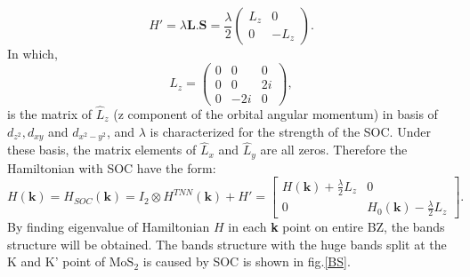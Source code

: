 \documentclass[12pt,english,a4paper]{article}
\begin{document}
	\begin{equation}
		H' = \lambda \textbf{L}.\textbf{S}=\frac{\lambda}{2}\begin{pmatrix}
			L_z &0\\
			0 & -L_z
		\end{pmatrix}.
	\end{equation}
\quad In which,
	\begin{equation}
		L_z = \begin{pmatrix}
			0 & 0 & 0\\
			0 & 0 & 2i\\
			0 & -2i& 0
		\end{pmatrix},
	\end{equation}
is the matrix of $\hat{L}_z$ (z component of the orbital angular momentum) in basis of $d_{z^2}, d_{xy}$ and $d_{x^2-y^2}$, and $\lambda$ is characterized for the strength of the SOC. Under these basis, the matrix elements of $\hat{L}_x$ and $\hat{L}_y$ are all zeros. Therefore the Hamiltonian with SOC have the form:
	\begin{equation}
		H(\textbf{k}) = H_{SOC} (\textbf{k}) = I_2 \otimes H^{TNN} (\textbf{k}) +H' = \begin{bmatrix}
			H (\textbf{k}) + \frac{\lambda}{2} L_z & 0\\
			0& H_0 (\textbf{k}) - \frac{\lambda}{2} L_z
		\end{bmatrix}.
	\end{equation}
\quad By finding eigenvalue of Hamiltonian $H$ in each \textbf{k} point on entire BZ, the bands structure will be obtained. The bands structure with the huge bands split at the K and K' point of $\mathrm{MoS}_2$ is caused by SOC is shown in fig.\ref{BS}.
\end{document}
